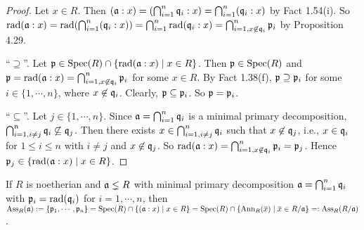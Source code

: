 \begin{proof}
    Let $x \in R$. Then $(\mathfrak{a}:x) = (\bigcap_{i=1}^{n} \mathfrak{q}_i:x) = \bigcap_{i=1}^{n} (\mathfrak{q}_i:x)$ by Fact 1.54(i). So $\operatorname{rad}(\mathfrak{a}:x) = \operatorname{rad}(\bigcap_{i=1}^{n}(\mathfrak{q}_i:x)) = \bigcap_{i=1}^{n} \operatorname{rad}(\mathfrak{q}_i:x) = \bigcap_{i=1, x \not \in \mathfrak{q}_i}^{n} \mathfrak{p}_i$ by Proposition 4.29. \par
    ``$\supseteq$''. Let $\mathfrak{p} \in \operatorname{Spec}(R) \cap \{\operatorname{rad}(\mathfrak{a}:x) \mid x \in R\}$. Then $\mathfrak{p} \in \operatorname{Spec}(R)$ and $\mathfrak{p} = \operatorname{rad}(\mathfrak{a}:x) = \bigcap_{i=1,x \not \in \mathfrak{q}_i}^{n} \mathfrak{p}_i$ for some $x \in R$. By Fact 1.38(f), $\mathfrak{p} \supseteq \mathfrak{p}_i$ for some $i \in \{1,\cdots,n\}$, where $x \not \in \mathfrak{q}_i$. Clearly, $\mathfrak{p} \subseteq \mathfrak{p}_i$. So $\mathfrak{p} = \mathfrak{p}_i$. \par 
    ``$\subseteq$''. Let $j \in \{1,\cdots,n\}$. Since $\mathfrak{a} = \bigcap_{i=1}^{n}\mathfrak{q}_i$ is a minimal primary decomposition, $\bigcap_{i=1,i \neq j}^{n} \mathfrak{q}_i \not\subseteq \mathfrak{q}_j$. Then there exists $x \in \bigcap_{i=1,i \neq j}^{n} \mathfrak{q}_i$ such that $x \not\in \mathfrak{q}_j$, i.e., $x \in \mathfrak{q}_i$ for $1 \leq i \leq n$ with $i \neq j$ and $x \not \in \mathfrak{q}_j$. So $\operatorname{rad}(\mathfrak{a}:x) = \bigcap_{i=1,x \not \in \mathfrak{q}_i}^{n} \mathfrak{p}_i = \mathfrak{p}_j$. Hence $\mathfrak{p}_j \in \{\operatorname{rad}(\mathfrak{a}:x) \mid x \in R\}$.
\end{proof}

\begin{theorem}
    If $R$ is noetherian and $\mathfrak{a} \lneq R$ with minimal primary decomposition $\mathfrak{a} = \bigcap_{i=1}^{n} \mathfrak{q}_i$ with $\mathfrak{p}_i = \operatorname{rad}(\mathfrak{q}_i)$ for $i = 1,\cdots,n$, then $\operatorname{Ass}_R(\ffa) := \{\ffp_1,\cdots,\ffp_n\} = \operatorname{Spec}(R) \cap \{(\ffa:x) \mid x \in R\} = \operatorname{Spec}(R) \cap \{\operatorname{Ann}_R(\overbar{x}) \mid \overbar{x} \in R/\ffa\} =: \operatorname{Ass}_R(R/\ffa)$.
\end{theorem}

